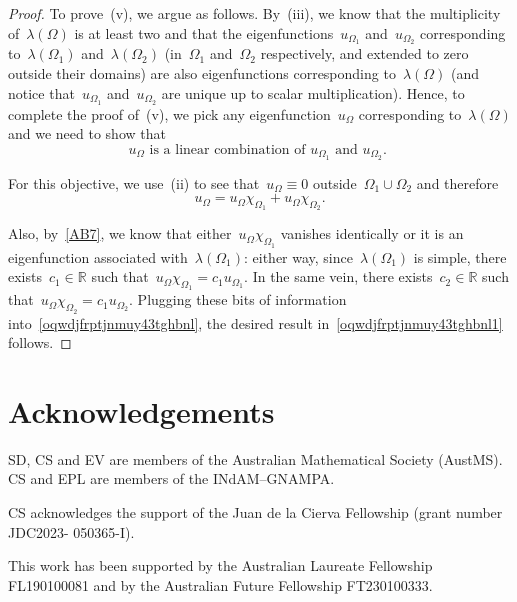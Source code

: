 \documentclass[12pt,a4paper,intlimits,sumlimits]{amsart}
\def \R {\mathbb{R}}
\theoremstyle{definition}
\theoremstyle{plain}
\numberwithin{equation}{section}
\begin{document}
\begin{appendix}
\begin{proof}
To prove~(v), we argue as follows. By~(iii), we know that the multiplicity of~$\lambda(\Omega)$ is at least two and that the eigenfunctions~$u_{\Omega_1}$
and~$u_{\Omega_2}$ corresponding to~$\lambda(\Omega_1)$ and~$\lambda(\Omega_2)$ (in~$\Omega_1$ and~$\Omega_2$
respectively, and extended to zero outside their domains) are also eigenfunctions
corresponding to~$\lambda(\Omega)$
(and notice that~$u_{\Omega_1}$ and~$u_{\Omega_2}$ are unique up to scalar multiplication). Hence, to complete the proof of~(v), we pick any eigenfunction~$u_\Omega$ corresponding to~$\lambda(\Omega)$ and we need to show that
\begin{equation} \label{oqwdjfrptjnmuy43tghbnl1}
{\mbox{$u_{\Omega}$ is a linear combination of~$u_{\Omega_1}$ and~$u_{\Omega_2}$. }}\end{equation}

For this objective, we use~(ii) to see that~$u_\Omega\equiv0$ outside~$\Omega_1\cup\Omega_2$ and therefore
\begin{equation} \label{oqwdjfrptjnmuy43tghbnl}
u_\Omega=u_\Omega\chi_{\Omega_1}+u_\Omega\chi_{\Omega_2}.\end{equation} 

Also, by~\eqref{AB7}, we know that either~$u_\Omega\chi_{\Omega_1}$ 
vanishes identically or it is an eigenfunction associated with~$\lambda(\Omega_1)$: either way, since~$\lambda(\Omega_1)$ is simple, there exists~$c_1\in\R$ such that~$u_\Omega\chi_{\Omega_1}=c_1u_{\Omega_1}$. In the same vein, there exists~$c_2\in\R$ such that~$u_\Omega\chi_{\Omega_2}=c_1u_{\Omega_2}$. Plugging these bits of information into~\eqref{oqwdjfrptjnmuy43tghbnl}, the desired result in~\eqref{oqwdjfrptjnmuy43tghbnl1} follows.
\end{proof}

\end{appendix}

\section*{Acknowledgements} 
SD, CS and EV are members of the Australian Mathematical Society (AustMS). CS and EPL are members of the INdAM--GNAMPA.

CS acknowledges the support of the Juan de la Cierva Fellowship (grant number JDC2023-
050365-I).

This work has been supported by the Australian Laureate Fellowship FL190100081
and by the Australian Future Fellowship FT230100333.
\end{document}
